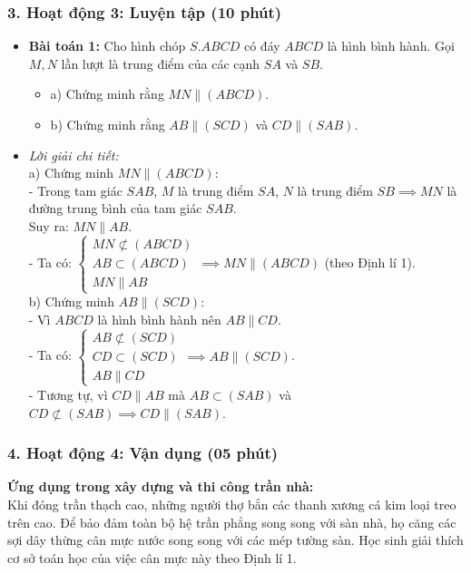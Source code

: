 \documentclass[12pt, a4paper]{article}
\begin{document}
\subsubsection*{3. Hoạt động 3: Luyện tập (10 phút)}
\begin{itemize}
    \item \textbf{Bài toán 1:} Cho hình chóp $S.ABCD$ có đáy $ABCD$ là hình bình hành. Gọi $M, N$ lần lượt là trung điểm của các cạnh $SA$ và $SB$.
    \begin{itemize}
        \item a) Chứng minh rằng $MN \parallel (ABCD)$.
        \item b) Chứng minh rằng $AB \parallel (SCD)$ và $CD \parallel (SAB)$.
    \end{itemize}
    \item \textit{Lời giải chi tiết:}\\
    a) Chứng minh $MN \parallel (ABCD)$:\\
    - Trong tam giác $SAB$, $M$ là trung điểm $SA$, $N$ là trung điểm $SB \implies MN$ là đường trung bình của tam giác $SAB$.\\
    Suy ra: $MN \parallel AB$.\\
    - Ta có: $\begin{cases} MN \not\subset (ABCD) \\ AB \subset (ABCD) \\ MN \parallel AB \end{cases} \implies MN \parallel (ABCD)$ (theo Định lí 1).\\
    b) Chứng minh $AB \parallel (SCD)$:\\
    - Vì $ABCD$ là hình bình hành nên $AB \parallel CD$.\\
    - Ta có: $\begin{cases} AB \not\subset (SCD) \\ CD \subset (SCD) \\ AB \parallel CD \end{cases} \implies AB \parallel (SCD)$.\\
    - Tương tự, vì $CD \parallel AB$ mà $AB \subset (SAB)$ và $CD \not\subset (SAB) \implies CD \parallel (SAB)$.
\end{itemize}

\subsubsection*{4. Hoạt động 4: Vận dụng (05 phút)}
\textbf{Ứng dụng trong xây dựng và thi công trần nhà:}\\
Khi đóng trần thạch cao, những người thợ bắn các thanh xương cá kim loại treo trên cao. Để bảo đảm toàn bộ hệ trần phẳng song song với sàn nhà, họ căng các sợi dây thừng cân mực nước song song với các mép tường sàn. Học sinh giải thích cơ sở toán học của việc cân mực này theo Định lí 1.
\end{document}
